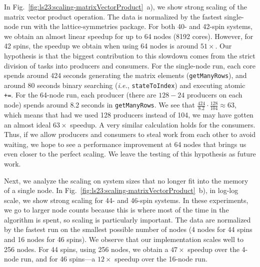In Fig.~\ref{fig:ls23:scaling-matrixVectorProduct}~a), we show strong scaling of the matrix vector product operation. The data is normalized by the fastest single-node run with the lattice-symmetries package. For both 40- and 42-spin systems, we obtain an almost linear speedup for up to 64 nodes (8192 cores). However, for 42 spins, the speedup we obtain when using 64 nodes is around $51\times$. Our hypothesis is that the biggest contribution to this slowdown comes from the strict division of tasks into producers and consumers. For the single-node run, each core spends around 424 seconds generating the matrix elements (\verb|getManyRows|), and around 80 seconds binary searching (\textit{i.e.}, \verb|stateToIndex|) and executing atomic \verb|+=|. For the 64-node run, each producer (there are $128 - 24$ producers on each node) spends around 8.2 seconds in \verb|getManyRows|. We see that $\frac{424}{8.2}\cdot \frac{128}{104} \approx 63$, which means that had we used 128 producers instead of 104, we may have gotten an almost ideal $63\times$ speedup. A very similar calculation holds for the consumers. Thus, if we allow producers and consumers to steal work from each other to avoid waiting, we hope to see a performance improvement at 64 nodes that brings us even closer to the perfect scaling. We leave the testing of this hypothesis as future work.

Next, we analyze the scaling on system sizes that no longer fit into the memory of a single node. In Fig.~\ref{fig:ls23:scaling-matrixVectorProduct}~b), in log-log scale, we show strong scaling for 44- and 46-spin systems. In these experiments, we go to larger node counts because this is where most of the time in the algorithm is spent, so scaling is particularly important. The data are normalized by the fastest run on the smallest possible number of nodes (4 nodes for 44 spins and 16 nodes for 46 spins). We observe that our implementation scales well to 256 nodes. For 44 spins, using 256 nodes, we obtain a $47 \times$ speedup over the 4-node run, and for 46 spins---a $12\times$ speedup over the 16-node run.


